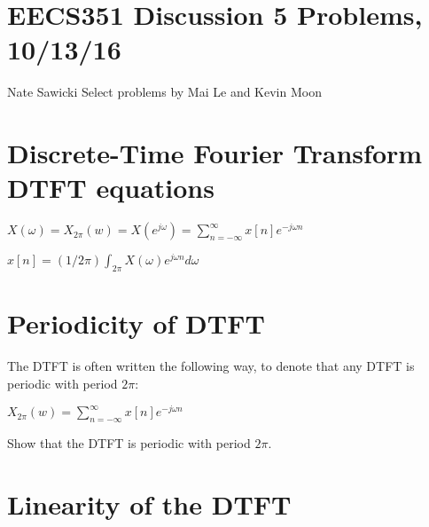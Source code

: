 \documentclass[11pt]{article}
\begin{document}
\section*{EECS351 Discussion 5 Problems, 10/13/16}
Nate Sawicki \newline
Select problems by Mai Le and Kevin Moon


\section{Discrete-Time Fourier Transform DTFT equations}

\vspace{3mm}

\begin{center}

$
X(\omega) = X_{2 \pi} (w) = X(e^{j \omega}) = \sum_{n = -\infty}^{\infty} x[n]  e^{-j \omega n}
$
\end{center}

\vspace{5mm}

\begin{center}

$
x[n] = (1/{2 \pi}) \int_{2 \pi}  X(\omega) e^{j \omega n} d \omega
$
\end{center}

\vspace{5mm}


\section{Periodicity of DTFT}

The DTFT is often written the following way, to denote that any DTFT is periodic with period $2 \pi$: \newline

\begin{center}

$
X_{2 \pi} (w) =\sum_{n = -\infty}^{\infty} x[n]  e^{-j \omega n}
$
\end{center}

\vspace{4mm}

Show that the DTFT is periodic with period $2 \pi$.



\vspace{3mm}


\section{Linearity of the DTFT}
\end{document}
